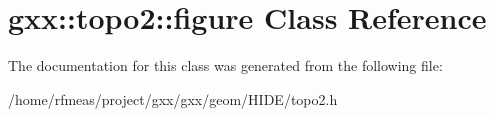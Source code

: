\hypertarget{classgxx_1_1topo2_1_1figure}{}\section{gxx\+:\+:topo2\+:\+:figure Class Reference}
\label{classgxx_1_1topo2_1_1figure}


The documentation for this class was generated from the following file\+:\begin{DoxyCompactItemize}
\item 
/home/rfmeas/project/gxx/gxx/geom/\+H\+I\+D\+E/topo2.\+h\end{DoxyCompactItemize}
